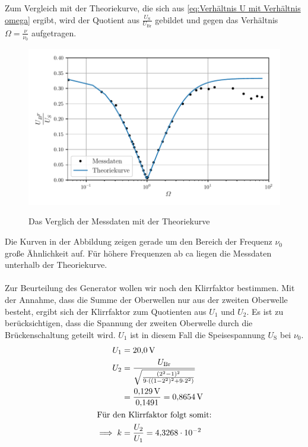 Zum Vergleich mit der Theoriekurve, die sich aus \eqref{eq:Verhältnis U mit Verhältnis omega}
ergibt, wird der Quotient aus $\frac{U_{\text{S}}}{U_{\text{Br}}}$ gebildet und gegen das Verhältnis $\Omega = \frac{\nu}{\nu_0}$ aufgetragen.\\
\begin{figure}
  \centering
  \caption{Das Verglich der Messdaten mit der Theoriekurve}
  \includegraphics[width = \textwidth]{plot.pdf}
  \label{fig:auswplot}
\end{figure}
Die Kurven in der Abbildung zeigen gerade um den Bereich der Frequenz $\nu_0$ große Ähnlichkeit auf.
Für höhere Frequenzen ab ca liegen die Messdaten unterhalb der Theoriekurve.\\
\\
Zur Beurteilung des Generator wollen wir noch den Klirrfaktor bestimmen.
Mit der Annahme, dass die Summe der Oberwellen nur aus der zweiten Oberwelle besteht, ergibt sich der Klirrfaktor zum Quotienten aus $U_1$ und $U_2$.
Es ist zu berücksichtigen, dass die Spannung der zweiten Oberwelle durch die Brückenschaltung geteilt wird.
$U_1$ ist in diesem Fall die Speisespannung $U_{\text{S}}$ bei $\nu_0$.
\begin{align*}
  U_1 &= \SI{20.0}{\volt}\\
  U_2 &= \frac{U_{\text{Br}}}{\sqrt{\frac{(2^2 -1)^2}{9\cdot ((1-2^2)^2 + 9\cdot 2^2)}}}\\
&= \frac{\SI{0.129}{\volt}}{\num{0.1491}} = \SI{0.8654}{\volt}\\
\intertext{Für den Klirrfaktor folgt somit:}
\implies k &= \frac{U_2}{U_1} = \num{4.3268e-2}
\end{align*}